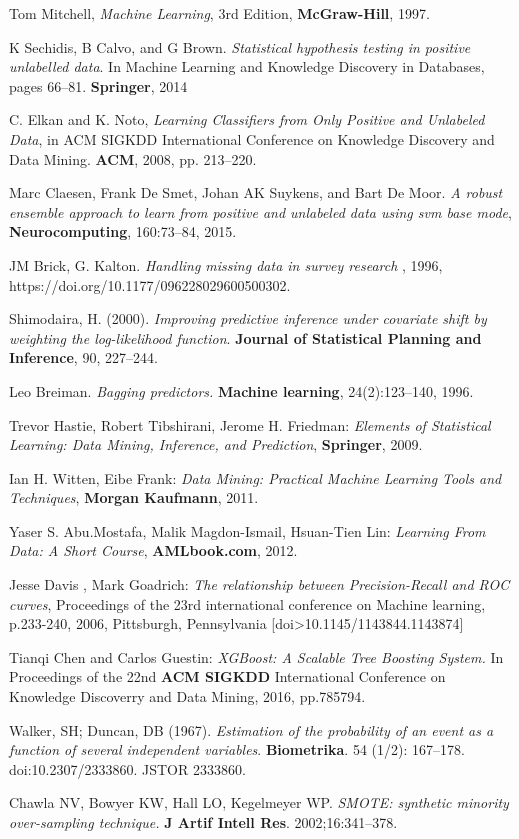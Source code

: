 \begin{thebibliography}{9}
Tom Mitchell, \textit{Machine Learning}, 3rd Edition, \textbf{McGraw-Hill}, 1997.

K Sechidis, B Calvo, and G Brown. \textit{Statistical hypothesis testing in positive unlabelled data}. In Machine Learning and Knowledge Discovery in Databases, pages 66–81. \textbf{Springer}, 2014

C. Elkan and K. Noto, \textit{Learning Classifiers from Only Positive and Unlabeled Data}, in ACM SIGKDD International Conference on Knowledge Discovery and Data Mining. \textbf{ACM}, 2008, pp. 213–220.

Marc Claesen, Frank De Smet, Johan AK Suykens, and Bart De Moor. \textit{A robust ensemble approach to learn from positive and unlabeled data using svm base mode}, \textbf{Neurocomputing}, 160:73–84, 2015.

JM Brick, G. Kalton. \textit{Handling missing data in survey research }, 1996, https://doi.org/10.1177/096228029600500302.

Shimodaira, H. (2000). \textit{Improving predictive inference under covariate shift by weighting the log-likelihood function}. \textbf{Journal of Statistical Planning and Inference}, 90, 227–244.

Leo Breiman. \textit{Bagging predictors.} \textbf{Machine learning}, 24(2):123–140, 1996.

Trevor Hastie, Robert Tibshirani, Jerome H. Friedman: \textit{Elements of Statistical Learning: Data Mining, Inference, and Prediction}, \textbf{Springer}, 2009.

Ian H. Witten, Eibe Frank: \textit{Data Mining: Practical Machine Learning Tools and Techniques}, \textbf{Morgan Kaufmann}, 2011.

Yaser S. Abu.Mostafa, Malik Magdon-Ismail, Hsuan-Tien Lin: \textit{Learning From Data: A Short Course}, \textbf{AMLbook.com}, 2012.

Jesse Davis , Mark Goadrich: \textit{The relationship between Precision-Recall and ROC curves}, Proceedings of the 23rd international conference on Machine learning, p.233-240, 2006, Pittsburgh, Pennsylvania  [doi>10.1145/1143844.1143874] 

Tianqi Chen and Carlos Guestin: \textit{XGBoost: A Scalable Tree Boosting System.} In Proceedings of the 22nd \textbf{ACM SIGKDD} International Conference on Knowledge Discoverry and Data Mining, 2016, pp.785794.

Walker, SH; Duncan, DB (1967). \textit{Estimation of the probability of an event as a function of several independent variables}. \textbf{Biometrika}. 54 (1/2): 167–178. doi:10.2307/2333860. JSTOR 2333860.

Chawla NV, Bowyer KW, Hall LO, Kegelmeyer WP. \textit{SMOTE: synthetic minority over-sampling technique.} \textbf{J Artif Intell Res}. 2002;16:341–378.


\end{thebibliography}
